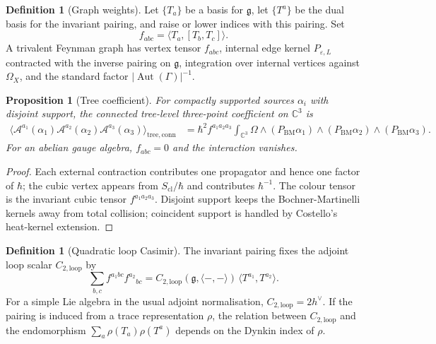 \documentclass[11pt]{article}
\newtheorem{proposition}[theorem]{Proposition}
\theoremstyle{definition}
\newtheorem{definition}[theorem]{Definition}
\theoremstyle{remark}
\providecommand{\C}{\mathbb{C}}
\providecommand{\fg}{\mathfrak{g}}
\providecommand{\cA}{\mathcal{A}}
\providecommand{\Ctwo}{C_{2,\mathrm{loop}}}
\begin{document}
\begin{definition}[Graph weights]
\label{def:graph-weights}
Let $\{T_a\}$ be a basis for $\fg$, let $\{T^a\}$ be the dual basis for
the invariant pairing, and raise or lower indices with this pairing.
Set
\[
  f_{abc}=\langle T_a,[T_b,T_c]\rangle .
\]
A trivalent Feynman graph has vertex tensor $f_{abc}$, internal edge
kernel $P_{\varepsilon,L}$ contracted with the inverse pairing on
$\fg$, integration over internal vertices against $\Omega_X$, and the
standard factor $|\operatorname{Aut}(\Gamma)|^{-1}$.
\end{definition}

\begin{proposition}[Tree coefficient]
\label{prop:tree-coefficient}
For compactly supported sources $\alpha_i$ with disjoint support, the
connected tree-level three-point coefficient on $\C^3$ is
\[
\begin{aligned}
  \bigl\langle
  \cA^{a_1}(\alpha_1)
  \cA^{a_2}(\alpha_2)
  \cA^{a_3}(\alpha_3)
  \bigr\rangle_{\mathrm{tree,conn}}
  &=
  \hbar^2 f^{a_1a_2a_3}
  \int_{\C^3}\Omega\wedge
  (P_{\mathrm{BM}}\alpha_1)\wedge
  (P_{\mathrm{BM}}\alpha_2)\wedge
  (P_{\mathrm{BM}}\alpha_3).
\end{aligned}
\]
For an abelian gauge algebra, $f_{abc}=0$ and the interaction vanishes.
\end{proposition}

\begin{proof}
Each external contraction contributes one propagator and hence one
factor of $\hbar$; the cubic vertex appears from
$S_{\mathrm{cl}}/\hbar$ and contributes $\hbar^{-1}$.  The colour tensor
is the invariant cubic tensor $f^{a_1a_2a_3}$.  Disjoint support keeps
the Bochner-Martinelli kernels away from total collision; coincident
support is handled by Costello's heat-kernel extension.
\end{proof}

\begin{definition}[Quadratic loop Casimir]
\label{def:quadratic-casimir}
The invariant pairing fixes the adjoint loop scalar $\Ctwo$ by
\[
  \sum_{b,c}f^{a_1bc}f^{a_2}{}_{bc}
  =
  \Ctwo(\fg,\langle-,-\rangle)\,
  \langle T^{a_1},T^{a_2}\rangle .
\]
For a simple Lie algebra in the usual adjoint normalisation,
$\Ctwo=2h^\vee$.  If the pairing is induced from a trace
representation $\rho$, the relation between $\Ctwo$ and the endomorphism
$\sum_a\rho(T_a)\rho(T^a)$ depends on the Dynkin index of $\rho$.
\end{definition}
\end{document}
